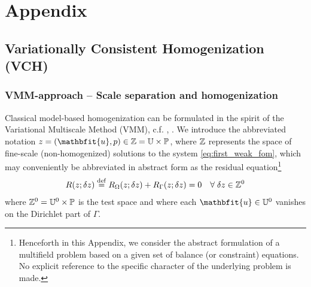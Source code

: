 \documentclass[12pt,a4paper]{article}
\renewcommand{\ta}[1]{\mathbfit{#1}}
\begin{document}



%
%
%

%

\appendix
\setcounter{equation}{0}
\renewcommand{\theequation}{A-\arabic{equation}}

\section{Appendix}

\subsection{Variationally Consistent Homogenization (VCH)}

\subsubsection{VMM-approach -- Scale separation and homogenization}

Classical model-based homogenization can be formulated in the spirit of the Variational Multiscale Method (VMM), c.f. \cite{Hughesetal1998}, \cite{LarsonMalqvist2007}.
We introduce the abbreviated notation $z = (\ta u, p) \in \set{Z} = \set U \times \set P$, where $\mathbb{Z}$ represents the space of fine-scale (non-homogenized) solutions to the system \eqref{eq:first_weak_fom}, which may conveniently be abbreviated in abstract form as the residual equation\footnote{Henceforth in this Appendix, we consider the abstract formulation of a multifield problem based on a given set of balance (or constraint) equations.
No explicit reference to the specific character of the underlying problem is made.}
\begin{align}
 R(z; \delta z) \overset{\mathrm{def}}{=} R_\Omega(z; \delta z) + R_\Gamma(z;\delta z) = 0\quad \forall\;\delta z\in \mathbb{Z}^0
\label{eq:A1}
\end{align}
where $\mathbb{Z}^0 = \mathbb{U}^0 \times \mathbb{P}$ is the test space and where each $\ta u\in \set U^0$ vanishes on the Dirichlet part of $\Gamma$.
\end{document}
